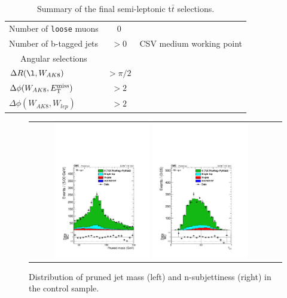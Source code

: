 \begin{table}[h!]
\begin{tabular}{lcc}
Number of \texttt{loose} muons & 0    & \\
Number of b-tagged jets           & $>0$    & CSV medium working point \\
\hline
\multicolumn{1}{c}{Angular selections}\\
\cline{1-1}
$\Delta R(\l,W_{AK8})         $ & $> \pi/2$ & \\
$\Delta \phi(W_{AK8},E_{\mathrm{T}}^{\text{miss}}) $ & $> 2$     & \\
$\Delta \phi(W_{AK8},W_{lep}) $ & $> 2$     & \\
\hline
\end{tabular}
\caption{Summary of the final semi-leptonic t$\bar{t}$ selections.}
\label{tab:searchII:cutsummary}
\end{table}

\begin{figure}[ht!]
\centering
\begin{tabular}{cc}
\includegraphics[width=0.4\textwidth]{figures/vtagging/AN-16-215/Whadr_pruned_mu.pdf}
\includegraphics[width=0.4\textwidth]{figures/vtagging/AN-16-215/Whadr_tau21_mu.pdf}\\
\end{tabular}
\caption{Distribution of pruned jet mass (left) and n-subjettiness (right) in the \ttbar control sample.} 
\label{fig:searchI:ttbarcp}
\end{figure}
\clearpage
